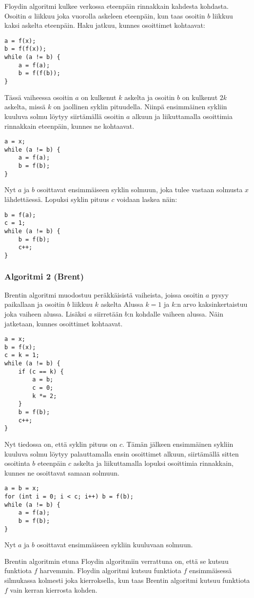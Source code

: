 Floydin algoritmi kulkee verkossa eteenpäin rinnakkain
kahdesta kohdasta.
Osoitin $a$ liikkuu joka vuorolla askeleen eteenpäin,
kun taas osoitin $b$ liikkuu kaksi askelta eteenpäin.
Haku jatkuu, kunnes osoittimet kohtaavat:

\begin{lstlisting}
a = f(x);
b = f(f(x));
while (a != b) {
    a = f(a);
    b = f(f(b));
}
\end{lstlisting}

Tässä vaiheessa osoitin $a$ on kulkenut $k$ askelta
ja osoitin $b$ on kulkenut $2k$ askelta,
missä $k$ on jaollinen syklin pituudella.
Niinpä ensimmäinen sykliin kuuluva solmu löytyy siirtämällä
osoitin $a$ alkuun ja liikuttamalla osoittimia
rinnakkain eteenpäin, kunnes ne kohtaavat.

\begin{lstlisting}
a = x;
while (a != b) {
    a = f(a);
    b = f(b);
}
\end{lstlisting}

Nyt $a$ ja $b$ osoittavat ensimmäiseen syklin
solmuun, joka tulee vastaan solmusta $x$ lähdettäessä.
Lopuksi syklin pituus $c$ voidaan laskea näin:

\begin{lstlisting}
b = f(a);
c = 1;
while (a != b) {
    b = f(b);
    c++;
}
\end{lstlisting}

\subsubsection{Algoritmi 2 (Brent)}

Brentin algoritmi
muodostuu peräkkäisistä vaiheista, joissa osoitin $a$ pysyy
paikallaan ja osoitin $b$ liikkuu $k$ askelta
Alussa $k=1$ ja $k$:n arvo kaksinkertaistuu
joka vaiheen alussa.
Lisäksi $a$ siirretään $b$:n kohdalle vaiheen alussa.
Näin jatketaan, kunnes osoittimet kohtaavat.

\begin{lstlisting}
a = x;
b = f(x);
c = k = 1;
while (a != b) {
    if (c == k) {
        a = b;
        c = 0;
        k *= 2;
    }
    b = f(b);
    c++;
}
\end{lstlisting}

Nyt tiedossa on, että syklin pituus on $c$.
Tämän jälkeen ensimmäinen sykliin kuuluva solmu löytyy
palauttamalla ensin osoittimet alkuun,
siirtämällä sitten osoitinta $b$ eteenpäin $c$ askelta
ja liikuttamalla lopuksi osoittimia rinnakkain,
kunnes ne osoittavat samaan solmuun.

\begin{lstlisting}
a = b = x;
for (int i = 0; i < c; i++) b = f(b);
while (a != b) {
    a = f(a);
    b = f(b);
}
\end{lstlisting}

Nyt $a$ ja $b$ osoittavat ensimmäiseen sykliin kuuluvaan solmuun.

Brentin algoritmin etuna Floydin algoritmiin verrattuna on,
että se kutsuu funktiota $f$ harvemmin.
Floydin algoritmi kutsuu funktiota $f$ ensimmäisessä silmukassa
kolmesti joka kierroksella, kun taas Brentin algoritmi
kutsuu funktiota $f$ vain kerran kierrosta kohden.